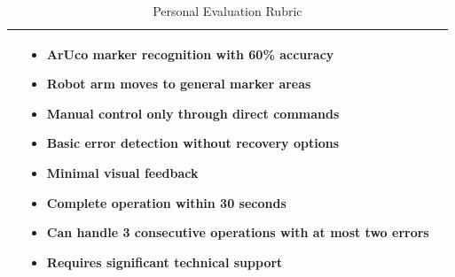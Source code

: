 \documentclass[10pt,twocolumn]{article}
\begin{document}
\begin{table}[t]
\begin{center}
\begin{tabular}{|p{}|p{}|p{}|}
\vspace{1mm} & 
\vspace{1mm}
\begin{itemize}[leftmargin=*,nosep]
    \item ArUco marker recognition with 60\% accuracy
    \item Robot arm moves to general marker areas
    \item Manual control only through direct commands
    \item Basic error detection without recovery options
    \item Minimal visual feedback
    \item Complete operation within 30 seconds
    \item Can handle 3 consecutive operations with at most two errors
    \item Requires significant technical support
\end{itemize}
\vspace{1mm} \\
\hline
\end{tabular}
\end{center}
\vspace{-2mm}  %
\caption{Personal Evaluation Rubric}
\label{tbl:evaluation-rubric}
\end{table}
\end{document}
